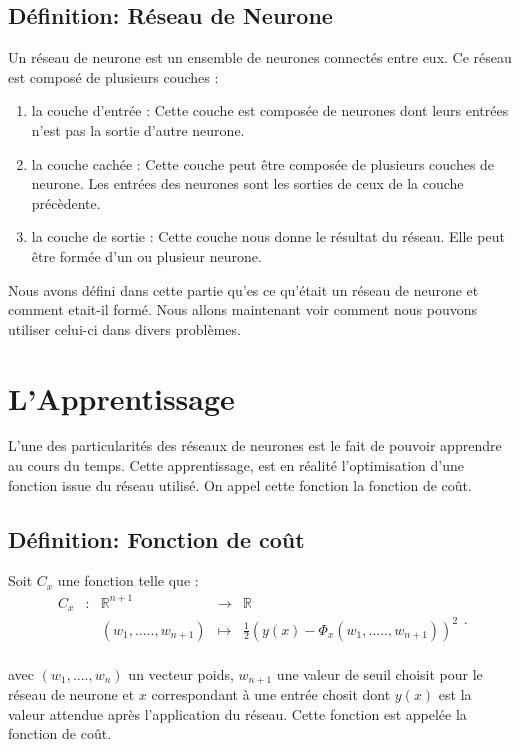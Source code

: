 \documentclass{article}
\newcommand{\fonction}[5]{
	\begin{array}{ccccc}
#1 & : & #2 & \to & #3\\
	& & #4 & \mapsto & #5\\ 
	\end{array}
}
\begin{document}
	\subsection{Définition: Réseau de Neurone}
 	Un réseau de neurone est un ensemble de neurones connectés entre eux. Ce réseau est composé de plusieurs couches : 
	\begin{enumerate}	
		\item la couche d'entrée : Cette couche est composée de neurones dont leurs entrées n'est pas la sortie d'autre neurone. 
		\item la couche cachée : Cette couche peut être composée de plusieurs couches de neurone. Les entrées des neurones sont les sorties de ceux de la couche précèdente.
		\item la couche de sortie : Cette couche nous donne le résultat du réseau. Elle peut être formée d'un ou plusieur neurone.
	\end{enumerate}		
		
	Nous avons défini dans cette partie qu'es ce qu'était un réseau de neurone et comment etait-il formé. Nous allons maintenant voir comment nous pouvons utiliser celui-ci dans divers problèmes. 
	
	
\section{L'Apprentissage}	
L'une des particularités des réseaux de neurones est le fait de pouvoir apprendre au cours du temps. Cette apprentissage, est en réalité l'optimisation d'une fonction issue du réseau utilisé. On appel cette fonction la fonction de coût. \\
 
	\subsection{Définition: Fonction de coût}
		Soit $C_{x}$ une fonction telle que :	
		  \[ \fonction{C_{x}}{\mathbb{R}^{n+1}}{\mathbb{R}}{(w_1,.....,w_{n+1})}{\frac{1}{2}(y(x)-\Phi_{x}(w_1,.....,w_{n+1}))^{2}}. \]

		avec $(w_1,....,w_n)$ un vecteur poids, $w_{n+1}$ une valeur de seuil choisit pour le réseau de neurone et $x$ correspondant à une entrée chosit dont $y(x)$ est la valeur attendue après l'application du réseau. Cette fonction est appelée la fonction de coût. \\
\end{document}
